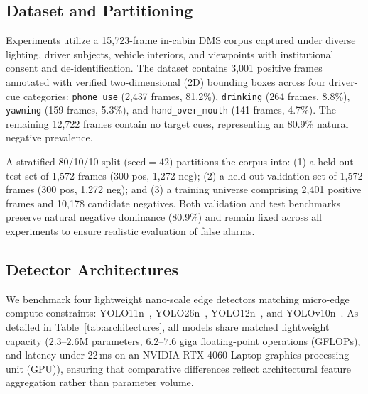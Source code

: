 \documentclass[conference]{IEEEtran}
\begin{document}
\subsection{Dataset and Partitioning}
\label{subsec:dataset}
Experiments utilize a 15,723-frame in-cabin DMS corpus captured under diverse lighting, driver subjects, vehicle interiors, and viewpoints with institutional consent and de-identification. The dataset contains 3,001 positive frames annotated with verified two-dimensional (2D) bounding boxes across four driver-cue categories: \texttt{phone\_use} (2,437 frames, 81.2\%), \texttt{drinking} (264 frames, 8.8\%), \texttt{yawning} (159 frames, 5.3\%), and \texttt{hand\_over\_mouth} (141 frames, 4.7\%). The remaining 12,722 frames contain no target cues, representing an 80.9\% natural negative prevalence.

A stratified 80/10/10 split ($\text{seed}{=}42$) partitions the corpus into: (1) a held-out test set of 1,572 frames (300 pos, 1,272 neg); (2) a held-out validation set of 1,572 frames (300 pos, 1,272 neg); and (3) a training universe comprising 2,401 positive frames and 10,178 candidate negatives. Both validation and test benchmarks preserve natural negative dominance (80.9\%) and remain fixed across all experiments to ensure realistic evaluation of false alarms.

\subsection{Detector Architectures}
\label{subsec:architectures}
We benchmark four lightweight nano-scale edge detectors matching micro-edge compute constraints: YOLO11n~\cite{b9}, YOLO26n~\cite{b10}, YOLO12n~\cite{b11}, and YOLOv10n~\cite{b20}. As detailed in Table~\ref{tab:architectures}, all models share matched lightweight capacity ($2.3$--$2.6\text{M}$ parameters, $6.2$--$7.6$ giga floating-point operations (GFLOPs), and latency under $22$\,ms on an NVIDIA RTX 4060 Laptop graphics processing unit (GPU)), ensuring that comparative differences reflect architectural feature aggregation rather than parameter volume.
\end{document}
